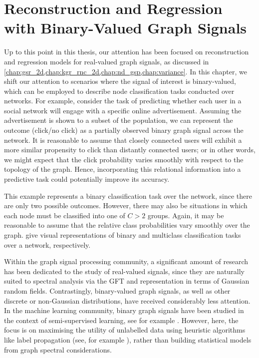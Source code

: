 \chapter{Reconstruction and Regression with Binary-Valued Graph Signals} %

\label{chap:binary} 


Up to this point in this thesis, our attention has been focused on reconstruction and regression models for real-valued graph signals, as discussed in \cref{chap:gsr_2d,chap:kgr_rnc_2d,chap:nd_gsp,chap:variance}. In this chapter, we shift our attention to scenarios where the signal of interest is binary-valued, which can be employed to describe node classification tasks conducted over networks. For example, consider the task of predicting whether each user in a social network will engage with a specific online advertisement. Assuming the advertisement is shown to a subset of the population, we can represent the outcome (click/no click) as a partially observed binary graph signal across the network. It is reasonable to assume that closely connected users will exhibit a more similar propensity to click than distantly connected users; or in other words, we might expect that the click probability varies smoothly with respect to the topology of the graph. Hence, incorporating this relational information into a predictive task could potentially improve its accuracy.

This example represents a binary classification task over the network, since there are only two possible outcomes. However, there may also be situations in which each node must be classified into one of $C > 2$ groups. Again, it may be reasonable to assume that the relative class probabilities vary smoothly over the graph.  give visual representations of binary and multiclass classification tasks over a network, respectively.

Within the graph signal processing community, a significant amount of research has been dedicated to the study of real-valued signals, since they are naturally suited to spectral analysis via the GFT and representation in terms of Gaussian random fields. Contrastingly, binary-valued graph signals, as well as other discrete or non-Gaussian distributions, have received considerably less attention. In the machine learning community, binary graph signals have been studied in the context of semi-supervised learning, see for example \cite{Kondor2002,Zhu2003}. However, here, the focus is on maximising the utility of unlabelled data using heuristic algorithms like label propagation (see, for example \cite{Zhang2017}), rather than building statistical models from graph spectral considerations. 

